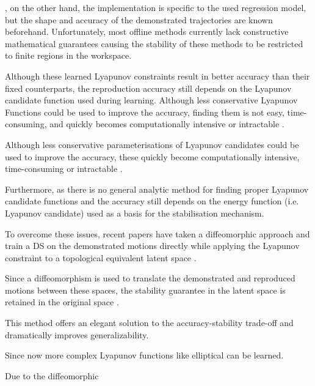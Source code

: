 \cite{neumannNeuralLearningStable2013,lemmeNeuralLearningVector2014,tesfazgiInverseReinforcementLearning2021,coulombeGeneratingStableCollisionFree2022}, on the other hand, the implementation is specific to the used regression model, but the shape and accuracy of the demonstrated trajectories are known beforehand. Unfortunately, most offline methods currently lack constructive mathematical guarantees causing the stability of these methods to be restricted to finite regions in the workspace. 





Although these learned Lyapunov constraints result in better accuracy than their fixed counterparts, the reproduction accuracy still depends on the Lyapunov candidate function used during learning. Although less conservative Lyapunov Functions could be used to improve the accuracy, finding them is not easy, time-consuming, and quickly becomes computationally intensive or intractable \cite {}.

Although less conservative parameterisations of Lyapunov candidates could be used to improve the accuracy, these quickly become computationally intensive, time-consuming or intractable \cite{}. 

Furthermore, as there is no general analytic method for finding proper Lyapunov candidate functions and the accuracy still depends on the energy function (i.e. Lyapunov candidate) used as a basis for the stabilisation mechanism.

To overcome these issues, recent papers have taken a diffeomorphic approach and train a DS on the demonstrated motions directly while applying the Lyapunov constraint to a topological equivalent latent space \cite{neumannLearningRobotMotions2015,perrinFastDiffeomorphicMatching2016,jinImprovedLearningAccuracy2019}. 

Since a diffeomorphism is used to translate the demonstrated and reproduced motions between these spaces, the stability guarantee in the latent space is retained in the original space \cite{leeIntroductionTopologicalManifolds2011,leeIntroductionSmoothManifolds2012,leeIntroductionRiemannianManifolds2018}. 


This method offers an elegant solution to the accuracy-stability trade-off and dramatically improves generalizability.


Since now more complex Lyapunov functions like elliptical can be learned. 


Due to the diffeomorphic 

